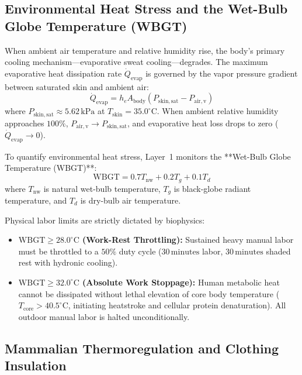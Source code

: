 \subsection{Environmental Heat Stress and the Wet-Bulb Globe Temperature (WBGT)}

When ambient air temperature and relative humidity rise, the body's primary cooling mechanism---evaporative sweat cooling---degrades. The maximum evaporative heat dissipation rate $\dot{Q}_{\mathrm{evap}}$ is governed by the vapor pressure gradient between saturated skin and ambient air:
\begin{equation}
\dot{Q}_{\mathrm{evap}} = h_e A_{\mathrm{body}} (P_{\mathrm{skin, sat}} - P_{\mathrm{air, v}})
\label{eq:evaporative_cooling}
\end{equation}
where $P_{\mathrm{skin, sat}} \approx 5.62\,\mathrm{kPa}$ at $T_{\mathrm{skin}} = 35.0^\circ\mathrm{C}$. When ambient relative humidity approaches $100\%$, $P_{\mathrm{air, v}} \to P_{\mathrm{skin, sat}}$, and evaporative heat loss drops to zero ($\dot{Q}_{\mathrm{evap}} \to 0$).

To quantify environmental heat stress, Layer~1 monitors the **Wet-Bulb Globe Temperature (WBGT)**:
\begin{equation}
\mathrm{WBGT} = 0.7 T_{\mathrm{nw}} + 0.2 T_g + 0.1 T_d
\label{eq:wbgt_equation}
\end{equation}
where $T_{\mathrm{nw}}$ is natural wet-bulb temperature, $T_g$ is black-globe radiant temperature, and $T_d$ is dry-bulb air temperature.

Physical labor limits are strictly dictated by biophysics:
\begin{itemize}
    \item \textbf{$\mathrm{WBGT} \ge 28.0^\circ\mathrm{C}$ (Work-Rest Throttling):} Sustained heavy manual labor must be throttled to a $50\%$ duty cycle ($30\,\mathrm{minutes}$ labor, $30\,\mathrm{minutes}$ shaded rest with hydronic cooling).
    \item \textbf{$\mathrm{WBGT} \ge 32.0^\circ\mathrm{C}$ (Absolute Work Stoppage):} Human metabolic heat cannot be dissipated without lethal elevation of core body temperature ($T_{\mathrm{core}} > 40.5^\circ\mathrm{C}$, initiating heatstroke and cellular protein denaturation). All outdoor manual labor is halted unconditionally.
\end{itemize}

\subsection{Mammalian Thermoregulation and Clothing Insulation}

